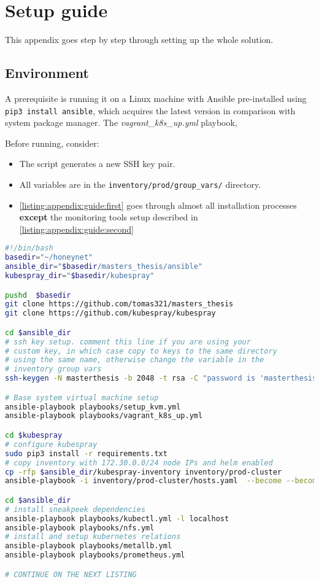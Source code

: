 \setcounter{figure}{0}
\setcounter{listing}{0}
\appendixpagenumbering

\chapter{Setup guide \label{appendix:guide}}
This appendix goes step by step through setting up the whole solution.

\section{Environment \label{appendix:guide:env}}
A prerequisite is running it on a Linux machine with Ansible pre-installed using \texttt{pip3 install ansible}, which acquires the latest version in comparison with system package manager. The \textit{vagrant\_k8s\_up.yml} playbook, 

Before running, consider:
\begin{itemize}[noitemsep]
	\item The script generates a new SSH key pair.
	\item All variables are in the \texttt{inventory/prod/group\_vars/} directory.
	\item \autoref{listing:appendix:guide:first} goes through almost all installation processes \textbf{except} the monitoring tools setup described in \autoref{listing:appendix:guide:second}
\end{itemize}
\begin{lstlisting}[language=bash, style=custom, caption={Full installation procedure without the final setup of the monitoring tools}, label=listing:appendix:guide:first]
#!/bin/bash
basedir="~/honeynet"
ansible_dir="$basedir/masters_thesis/ansible"
kubespray_dir="$basedir/kubespray"

pushd  $basedir
git clone https://github.com/tomas321/masters_thesis
git clone https://github.com/kubespray/kubespray

cd $ansible_dir
# ssh key setup. comment this line if you are using your
# custom key, in which case copy to keys to the same directory
# using the same name, otherwise change the variable in the 
# inventory group vars
ssh-keygen -N masterthesis -b 2048 -t rsa -C "password is 'masterthesis'" -f playbooks/files/.ssh/id_vagrant_k8s >/dev/null

# Base system virtual machine setup
ansible-playbook playbooks/setup_kvm.yml
ansible-playbook playbooks/vagrant_k8s_up.yml

cd $kubespray
# configure kubespray
sudo pip3 install -r requirements.txt
# copy inventory with 172.30.0.0/24 node IPs and helm enabled
cp -rfp $ansible_dir/kubespray-inventory inventory/prod-cluster
ansible-playbook -i inventory/prod-cluster/hosts.yaml  --become --become-user=root cluster.yml

cd $ansible_dir
# install sneakpeek dependencies
ansible-playbook playbooks/kubectl.yml -l localhost
ansible-playbook playbooks/nfs.yml
# install and setup kubernetes relations
ansible-playbook playbooks/metallb.yml
ansible-playbook playbooks/prometheus.yml

# CONTINUE ON THE NEXT LISTING
\end{lstlisting}

